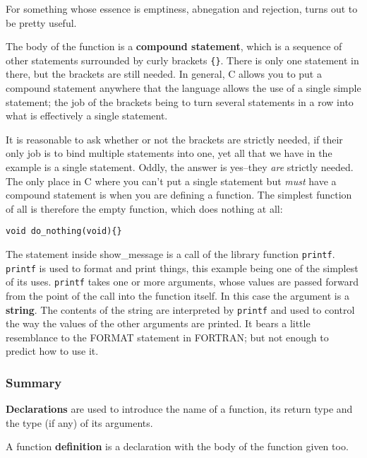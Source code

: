     For something whose essence is emptiness, abnegation and rejection,
     \void{} turns out to be pretty useful.


    The body of the function is a \textbf{compound statement}, which is a
     sequence of other statements surrounded by curly
     brackets \texttt{\{\}}. There is only one statement in there, but
     the brackets are still needed. In general, C allows you to put a compound
     statement anywhere that the language allows the use of a single simple
     statement; the job of the brackets being to turn several statements in a
     row into what is effectively a single statement.


    It is reasonable to ask whether or not the brackets are strictly needed,
     if their only job is to bind multiple statements into one, yet all that we
     have in the example is a single statement. Oddly, the answer is
     yes--they \textit{are} strictly needed. The only place in C where you
     can't put a single statement but \textit{must} have a compound statement
     is when you are defining a function. The simplest function of all is
     therefore the empty function, which does nothing at all:


    \begin{Verbatim}
void do_nothing(void){}
\end{Verbatim}

    The statement inside show\_message is a call of the library function
     \texttt{printf}. \texttt{printf} is used to format and print
     things, this example being one of the simplest of its
     uses. \texttt{printf} takes one or more arguments, whose values are
     passed forward from the point of the call into the function itself. In
     this case the argument is a \textbf{string}. The contents of the string
     are interpreted by \texttt{printf} and used to control the way the
     values of the other arguments are printed. It bears a little resemblance
     to the FORMAT statement in FORTRAN; but not enough to predict how to use
     it.


   

   \subsubsection{Summary}
    \textbf{Declarations} are used to introduce the name of a function,
     its return type and the type (if any) of its arguments.

    A function \textbf{definition} is a declaration with the body of the
     function given too.

